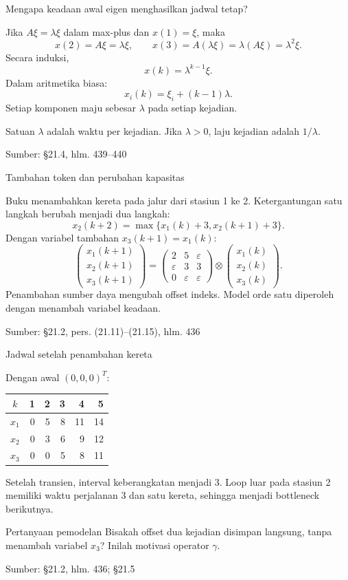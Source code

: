 \documentclass[aspectratio=169,11pt]{beamer}
\newcommand{\source}[1]{%
    \vfill
    \hfill{\tiny\color{gray}Sumber: #1}
}
\newcommand{\eps}{\varepsilon}
\newcommand{\mpmat}[1]{\begin{pmatrix}#1\end{pmatrix}}
\begin{document}
\begin{frame}{Mengapa keadaan awal eigen menghasilkan jadwal tetap?}

Jika $A\xi=\lambda\xi$ dalam max-plus dan $x(1)=\xi$, maka
\[
x(2)=A\xi=\lambda\xi,\qquad
x(3)=A(\lambda\xi)=\lambda(A\xi)=\lambda^2\xi.
\]
Secara induksi,
\[
x(k)=\lambda^{k-1}\xi.
\]
Dalam aritmetika biasa:
\[
x_i(k)=\xi_i+(k-1)\lambda.
\]
Setiap komponen maju sebesar $\lambda$ pada setiap kejadian.
\begin{block}{Satuan}
$\lambda$ adalah waktu per kejadian. Jika $\lambda>0$, laju kejadian adalah $1/\lambda$.
\end{block}

\source{\S21.4, hlm. 439--440}
\end{frame}
\begin{frame}{Tambahan token dan perubahan kapasitas}

Buku menambahkan kereta pada jalur dari stasiun 1 ke 2.
Ketergantungan satu langkah berubah menjadi dua langkah:
\[
x_2(k+2)=\max\{x_1(k)+3,x_2(k+1)+3\}.
\]
Dengan variabel tambahan $x_3(k+1)=x_1(k)$:
\[
\mpmat{x_1(k+1)\\x_2(k+1)\\x_3(k+1)}
=
\mpmat{2&5&\eps\\\eps&3&3\\0&\eps&\eps}
\otimes\mpmat{x_1(k)\\x_2(k)\\x_3(k)}.
\]
Penambahan sumber daya mengubah offset indeks.
Model orde satu diperoleh dengan menambah variabel keadaan.

\source{\S21.2, pers. (21.11)--(21.15), hlm. 436}
\end{frame}
\begin{frame}{Jadwal setelah penambahan kereta}

Dengan awal $(0,0,0)^T$:
\begin{center}\begin{tabular}{c|rrrrr}\toprule
$k$&1&2&3&4&5\\\midrule
$x_1$&0&5&8&11&14\\
$x_2$&0&3&6&9&12\\
$x_3$&0&0&5&8&11\\\bottomrule
\end{tabular}\end{center}
Setelah transien, interval keberangkatan menjadi $3$.
Loop luar pada stasiun 2 memiliki waktu perjalanan $3$ dan satu kereta,
sehingga menjadi bottleneck berikutnya.
\begin{block}{Pertanyaan pemodelan}
Bisakah offset dua kejadian disimpan langsung,
tanpa menambah variabel $x_3$? Inilah motivasi operator $\gamma$.
\end{block}

\source{\S21.2, hlm. 436; \S21.5}
\end{frame}
\end{document}

